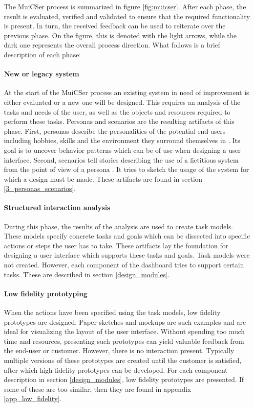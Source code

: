         The MuiCSer process is summarized in figure \ref{fig:muicser}. After each phase, the result is evaluated, verified and validated to ensure that the required functionality is present. In turn, the received feedback can be used to reiterate over the previous phase. On the figure, this is denoted with the light arrows, while the dark one represents the overall process direction. What follows is a brief description of each phase:

        \paragraph{New or legacy system} At the start of the MuiCSer process an existing system in need of improvement is either evaluated or a new one will be designed. This requires an analysis of the tasks and needs of the user, as well as the objects and resources required to perform these tasks. Personas and scenarios are the resulting artifacts of this phase. First, personas describe the personalities of the potential end users including hobbies, skills and the environment they surround themselves in \cite{persona_scenario}. Its goal is to uncover behavior patterns which can be of use when designing a user interface. Second, scenarios tell stories describing the use of a fictitious system from the point of view of a persona \cite{persona_scenario}. It tries to sketch the usage of the system for which a design must be made. These artifacts are found in section \ref{3_personas_scenarios}.

        \paragraph{Structured interaction analysis} During this phase, the results of the analysis are used to create task models. These models specify concrete tasks and goals which can be dissected into specific actions or steps the user has to take. These artifacts lay the foundation for designing a user interface which supports these tasks and goals. Task models were not created. However, each component of the dashboard tries to support certain tasks. These are described in section \ref{design_modules}.

        \paragraph{Low fidelity prototyping} When the actions have been specified using the task models, low fidelity prototypes are designed. Paper sketches and mockups are such examples and are ideal for visualizing the layout of the user interface. Without spending too much time and resources, presenting such prototypes can yield valuable feedback from the end-user or customer. However, there is no interaction present. Typically multiple versions of these prototypes are created until the customer is satisfied, after which high fidelity prototypes can be developed. For each component description in section \ref{design_modules}, low fidelity prototypes are presented. If some of these are too similar, then they are found in appendix \ref{app_low_fidelity}.

